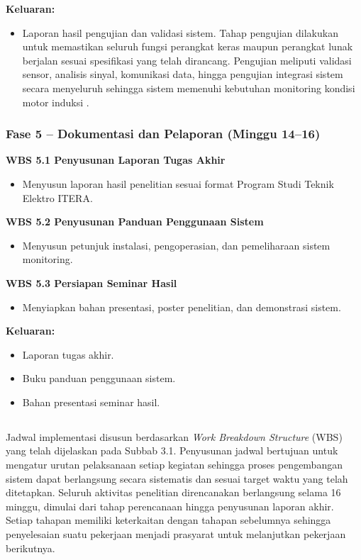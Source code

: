 \documentclass{elsinta}
\begin{document}
\textbf{Keluaran:}
\begin{itemize}
    \item Laporan hasil pengujian dan validasi sistem.
    Tahap pengujian dilakukan untuk memastikan seluruh fungsi perangkat keras maupun perangkat lunak berjalan sesuai spesifikasi yang telah dirancang. Pengujian meliputi validasi sensor, analisis sinyal, komunikasi data, hingga pengujian integrasi sistem secara menyeluruh sehingga sistem memenuhi kebutuhan monitoring kondisi motor induksi \cite{ProjectManagementInstitute2021,Jardine2006}.
\end{itemize}

\subsubsection*{Fase 5 -- Dokumentasi dan Pelaporan (Minggu 14--16)}

\textbf{WBS 5.1 Penyusunan Laporan Tugas Akhir}

\begin{itemize}
    \item Menyusun laporan hasil penelitian sesuai format Program Studi Teknik Elektro ITERA.
\end{itemize}

\textbf{WBS 5.2 Penyusunan Panduan Penggunaan Sistem}

\begin{itemize}
    \item Menyusun petunjuk instalasi, pengoperasian, dan pemeliharaan sistem monitoring.
\end{itemize}

\textbf{WBS 5.3 Persiapan Seminar Hasil}

\begin{itemize}
    \item Menyiapkan bahan presentasi, poster penelitian, dan demonstrasi sistem.
\end{itemize}

\textbf{Keluaran:}
\begin{itemize}
    \item Laporan tugas akhir.
    \item Buku panduan penggunaan sistem.
    \item Bahan presentasi seminar hasil.
\end{itemize}

\subsection{\TimelineTitle}
Jadwal implementasi disusun berdasarkan \textit{Work Breakdown Structure} (WBS) yang telah dijelaskan pada Subbab 3.1. Penyusunan jadwal bertujuan untuk mengatur urutan pelaksanaan setiap kegiatan sehingga proses pengembangan sistem dapat berlangsung secara sistematis dan sesuai target waktu yang telah ditetapkan. Seluruh aktivitas penelitian direncanakan berlangsung selama 16 minggu, dimulai dari tahap perencanaan hingga penyusunan laporan akhir. Setiap tahapan memiliki keterkaitan dengan tahapan sebelumnya sehingga penyelesaian suatu pekerjaan menjadi prasyarat untuk melanjutkan pekerjaan berikutnya.
\end{document}
